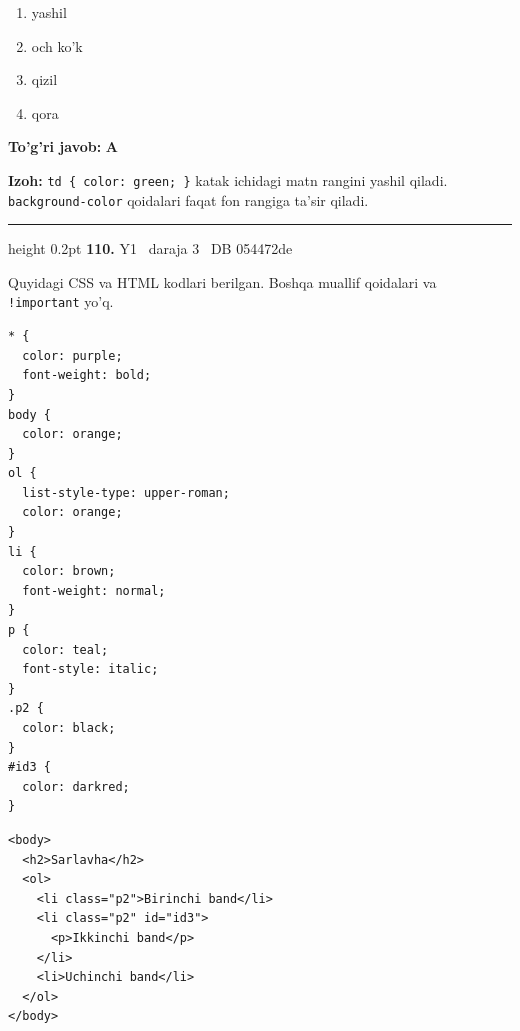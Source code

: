 \documentclass[10pt,a4paper,oneside]{article}
\begin{document}
\begin{enumerate}[label=\Alph*),leftmargin=9mm]
\item yashil
\item och ko'k
\item qizil
\item qora
\end{enumerate}
\begin{tcolorbox}[enhanced,breakable,colback=teal!4,colframe=teal!45!black,boxrule=0.45pt,arc=1.2mm,left=2.8mm,right=2.8mm,top=2mm,bottom=2mm,before skip=2mm,after skip=2mm]
\textbf{\color{teal}To'g'ri javob:} \textbf{A}
\par\smallskip
\textbf{Izoh:} \texttt{td \{ color: green; \}} katak ichidagi matn rangini yashil qiladi. \texttt{background-color} qoidalari faqat fon rangiga ta'sir qiladi.
\end{tcolorbox}
\vspace{2mm}\hrule height 0.2pt \vspace{4mm}
\hypertarget{q110}{\textbf{\color{ink}110.}}  {\color{muted}\scriptsize Y1 \textbullet\ daraja 3 \textbullet\ DB 054472de}
\par
Quyidagi CSS va HTML kodlari berilgan. Boshqa muallif qoidalari va \texttt{!important} yo'q.

\par
\begin{lstlisting}
* {
  color: purple;
  font-weight: bold;
}
body {
  color: orange;
}
ol {
  list-style-type: upper-roman;
  color: orange;
}
li {
  color: brown;
  font-weight: normal;
}
p {
  color: teal;
  font-style: italic;
}
.p2 {
  color: black;
}
#id3 {
  color: darkred;
}
\end{lstlisting}


\par
\begin{lstlisting}
<body>
  <h2>Sarlavha</h2>
  <ol>
    <li class="p2">Birinchi band</li>
    <li class="p2" id="id3">
      <p>Ikkinchi band</p>
    </li>
    <li>Uchinchi band</li>
  </ol>
</body>
\end{lstlisting}
\end{document}
